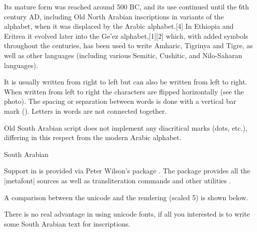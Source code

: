 Its mature form was reached around 500 BC, and its use continued until the 6th century AD, including Old North Arabian inscriptions in variants of the alphabet, when it was displaced by the Arabic alphabet.[4] In Ethiopia and Eritrea it evolved later into the Ge'ez alphabet,[1][2] which, with added symbols throughout the centuries, has been used to write Amharic, Tigrinya and Tigre, as well as other languages (including various Semitic, Cushitic, and Nilo-Saharan languages).

It is usually written from right to left but can also be written from left to right. When written from left to right the characters are flipped horizontally (see the photo).
The spacing or separation between words is done with a vertical bar mark (\textbar).
Letters in words are not connected together.

Old South Arabian script does not implement any diacritical marks (dots, etc.), differing in this respect from the modern Arabic alphabet.

\begin{scriptexample}[]{South Arabian}
\end{scriptexample}

Support in \latexe is provided via Peter Wilson's package . The package provides all the |metafont| sources as well as transliteration commands and other utilities .

\def\SAtdu{\oldsoutharabian\char"10A77}

A comparison between  the unicode and the rendering (scaled 5)  is shown below.

\centerline{\scalebox{3}{\SAtdu} \scalebox{3}{\textsarab{\SAtd}}}

There is no real advantage in using unicode fonts, if all you interested is to write some South Arabian text for inscriptions. 

